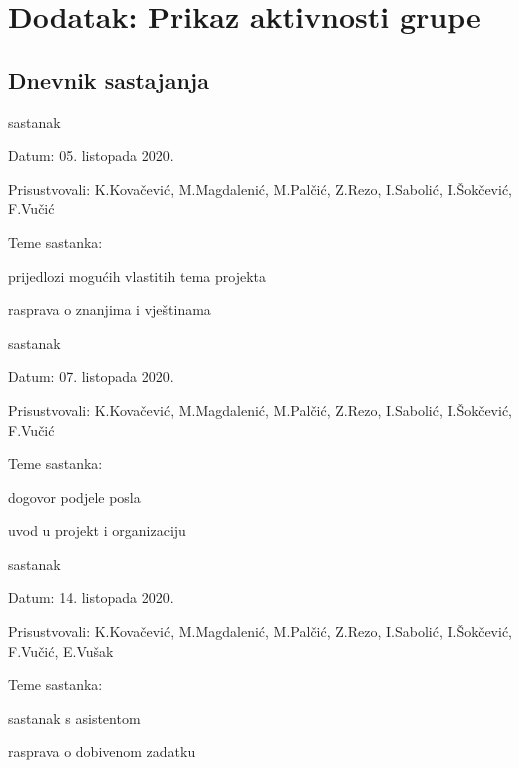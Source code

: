 \chapter{Dodatak: Prikaz aktivnosti grupe}

\section{Dnevnik sastajanja}


\begin{packed_enum}
	\item sastanak
	\begin{packed_item}
		\item Datum: 05. listopada 2020.
		\item Prisustvovali: K.Kovačević, M.Magdalenić, M.Palčić, Z.Rezo, I.Sabolić, I.Šokčević, F.Vučić
		\item Teme sastanka:
		\begin{packed_enum}
			\item prijedlozi mogućih vlastitih tema projekta
			\item rasprava o znanjima i vještinama\\
		\end{packed_enum}
	\end{packed_item}
	
	\item sastanak
	\begin{packed_item}
		\item Datum: 07. listopada 2020.
		\item Prisustvovali: K.Kovačević, M.Magdalenić, M.Palčić, Z.Rezo, I.Sabolić, I.Šokčević, F.Vučić
		\item Teme sastanka:
		\begin{packed_item}
			\item dogovor podjele posla
			\item uvod u projekt i organizaciju\\
		\end{packed_item}
	\end{packed_item}
	
	\item sastanak
	\begin{packed_item}
		\item Datum: 14. listopada 2020.
		\item Prisustvovali: K.Kovačević, M.Magdalenić, M.Palčić, Z.Rezo, I.Sabolić, I.Šokčević, F.Vučić, E.Vušak
		\item Teme sastanka:
		\begin{packed_item}
			\item sastanak s asistentom
			\item rasprava o dobivenom zadatku\\
		\end{packed_item}
	\end{packed_item}
	

\end{packed_enum}
